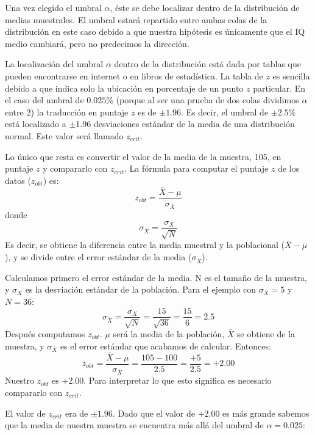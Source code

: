 \documentclass[a4paper,12pt]{article}
\begin{document}
Una vez elegido el umbral $\alpha$, éste se debe localizar dentro de la distribución de medias muestrales. El umbral estará repartido entre ambas colas de la distribución en este caso debido a que nuestra hipótesis es únicamente que el IQ medio cambiará, pero no predecimos la dirección.

La localización del umbral $\alpha$ dentro de la distribución está dada por tablas que pueden encontrarse en internet o en libros de estadística. La tabla de $z$ es sencilla debido a que indica solo la ubicación en porcentaje de un punto $z$ particular. En el caso del umbral de $0{.}025\%$ (porque al ser una prueba de dos colas dividimos $\alpha$ entre 2) la traducción en puntaje $z$ es de $\pm 1.96$. Es decir, el umbral de $\pm 2{.}5\%$ está localizado a $\pm$1.96 desviaciones estándar de la media de una distribución normal. Este valor será llamado $z_{crit}$.

Lo único que resta es convertir el valor de la media de la muestra, 105, en puntaje $z$ y compararlo con $z_{crit}$. La fórmula para computar el puntaje $z$ de los datos ($z_{obt}$) es:
\[
z_{obt} = \frac{
  \bar{X} - \mu
}{
  \sigma_{\bar{X}}
}
\]
donde
\[
  \sigma_{\bar{X}} = \frac{
    \sigma_{X}
  }{
    \sqrt{N}
  }
\]
Es decir, se obtiene la diferencia entre la media muestral y la poblacional ($\bar{X} - \mu$), y se divide entre el error estándar de la media ($\sigma_{\bar{X}}$).

Calculamos primero el error estándar de la media. N es el tamaño de la muestra, y $\sigma_{X}$ es la desviación estándar de la población. Para el ejemplo con $\sigma_X = 5$ y $N = 36$:
\[
  \sigma_{\bar{X}} = \frac{
    \sigma_{X}
  }{
    \sqrt{N}
  } = \frac{
    15
  }{
    \sqrt{36}
  } = \frac{
    15
  }{
    6
  } = 2{.}5
\]
Después computamos $z_{obt}$. $\mu$ será la media de la población, $\bar{X}$ se obtiene de la muestra, y $\sigma_{\bar{X}}$ es el error estándar que acabamos de calcular. Entonces:
\[
z_{obt} = \frac{
  \bar{X} - \mu
}{
  \sigma_{\bar{X}}
} = \frac{
  105 - 100
}{
  2{.}5
} = \frac{
  +5
}{
  2{.}5
} = +2{.}00
\]
Nuestro $z_{obt}$ es +2.00. Para interpretar lo que esto significa es necesario compararlo con $z_{crit}$.

El valor de $z_{crit}$ era de $\pm 1{.}96$. Dado que el valor de +2.00 es más grande sabemos que la media de nuestra muestra se encuentra más allá del umbral de $\alpha = 0{.}025$:
\end{document}
